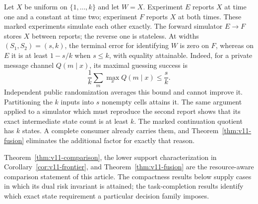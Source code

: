\begin{example}
\label{ex:v11-repetition}
Let $X$ be uniform on $\{1,\ldots,k\}$ and let $W=X$. Experiment $E$
reports $X$ at time one and a constant at time two; experiment $F$ reports
$X$ at both times. These marked experiments simulate each other exactly.
The forward simulator $E\longrightarrow F$ stores $X$ between reports;
the reverse one is stateless. At widths $(S_1,S_2)=(s,k)$, the terminal
error for identifying $W$ is zero on $F$, whereas on $E$ it is at least
$1-s/k$ when $s\le k$, with equality attainable.
Indeed, for a private message channel $Q(m\mid x)$, its maximal guessing
success is
\[
 \frac1k\sum_m\max_x Q(m\mid x)\le\frac{s}{k}.
\]
Independent public randomization averages this bound and cannot improve
it. Partitioning the $k$ inputs into $s$ nonempty cells attains it.
The same argument applied to a simulator which must reproduce the second
report shows that its exact intermediate state count is at least $k$.
The marked continuation quotient has $k$ states. A complete consumer
already carries them, and Theorem~\ref{thm:v11-fusion} eliminates the
additional factor for exactly that reason.
\end{example}

Theorem~\ref{thm:v11-comparison}, the lower support characterization in
Corollary~\ref{cor:v11-frontier}, and Theorem~\ref{thm:v11-fusion} are the
resource-aware comparison statement of this article. The compactness
results below supply cases in which its dual risk invariant is attained;
the task-completion results identify which exact state requirement a
particular decision family imposes.
